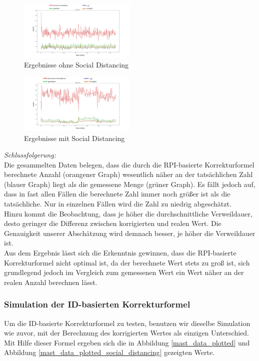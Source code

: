 \documentclass[conference,compsoc]{IEEEtran}
\begin{document}
\begin{figure}[h]
	\centering
	\includegraphics[width=0.5\textwidth]{"Mast_Data_Plotted_old"}
	\caption{Ergebnisse ohne Social Distancing}
	\label{mast_data_plotted_old}
\end{figure}
\begin{figure}[h]
	\centering
	\includegraphics[width=0.5\textwidth]{"Mast_Data_Plotted_Social_Distancing_old"}
	\caption{Ergebnisse mit Social Distancing}
	\label{mast_data_plotted_social_distancing_old}
\end{figure}
\textit{Schlussfolgerung:}\\
Die gesammelten Daten belegen, dass die durch die RPI-basierte Korrekturformel berechnete Anzahl (orangener Graph) wesentlich näher an der tatsächlichen Zahl (blauer Graph) liegt als die gemessene Menge (grüner Graph). Es fällt jedoch auf, dass in fast allen Fällen die berechnete Zahl immer noch größer ist als die tatsächliche. Nur in einzelnen Fällen wird die Zahl zu niedrig abgeschätzt.\\
Hinzu kommt die Beobachtung, dass je höher die durchschnittliche Verweildauer, desto geringer die Differenz zwischen korrigierten und realen Wert. Die Genauigkeit unserer Abschätzung wird demnach besser, je höher die Verweildauer ist.\\

Aus dem Ergebnis lässt sich die Erkenntnis gewinnen, dass die RPI-basierte Korrekturformel nicht optimal ist, da der berechnete Wert stets zu groß ist, sich grundlegend jedoch im Vergleich zum gemessenen Wert ein Wert näher an der realen Anzahl berechnen lässt.

\subsubsection{Simulation der ID-basierten Korrekturformel}
Um die ID-basierte Korrekturformel zu testen, benutzen wir dieselbe Simulation wie zuvor, mit der Berechnung des korrigierten Wertes als einzigen Unterschied.\\
Mit Hilfe dieser Formel ergeben sich die in Abbildung \ref{mast_data_plotted} und Abbildung \ref{mast_data_plotted_social_distancing} gezeigten Werte.
\end{document}
